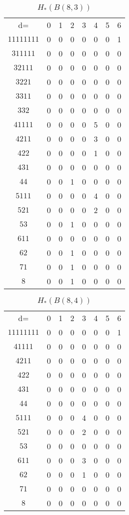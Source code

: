 \documentclass{elsart}
\begin{document}
\begin{table}
\begin{tabular}{cccccccc}
d=         & 0 & 1 & 2 & 3 & 4 & 5 & 6  \\
$11111111$ & 0 & 0 & 0 & 0 & 0 & 0 & 1  \\
$311111$   & 0 & 0 & 0 & 0 & 0 & 0 & 0  \\
$32111$    & 0 & 0 & 0 & 0 & 0 & 0 & 0  \\
$3221$     & 0 & 0 & 0 & 0 & 0 & 0 & 0  \\
$3311$     & 0 & 0 & 0 & 0 & 0 & 0 & 0  \\
$332$      & 0 & 0 & 0 & 0 & 0 & 0 & 0  \\
$41111$    & 0 & 0 & 0 & 0 & 5 & 0 & 0  \\
$4211$     & 0 & 0 & 0 & 0 & 3 & 0 & 0  \\
$422$      & 0 & 0 & 0 & 0 & 1 & 0 & 0  \\
$431$      & 0 & 0 & 0 & 0 & 0 & 0 & 0  \\
$44$       & 0 & 0 & 1 & 0 & 0 & 0 & 0  \\
$5111$     & 0 & 0 & 0 & 0 & 4 & 0 & 0  \\
$521$      & 0 & 0 & 0 & 0 & 2 & 0 & 0  \\
$53$       & 0 & 0 & 1 & 0 & 0 & 0 & 0  \\
$611$      & 0 & 0 & 0 & 0 & 0 & 0 & 0  \\
$62$       & 0 & 0 & 1 & 0 & 0 & 0 & 0  \\
$71$       & 0 & 0 & 1 & 0 & 0 & 0 & 0  \\
$8$        & 0 & 0 & 1 & 0 & 0 & 0 & 0  \\
\end{tabular}
\caption{$H_*(B(8,3))$}
\label{T:8_3}
\end{table}

\begin{table}
\begin{tabular}{cccccccc}
d= & 0 & 1 & 2 & 3 & 4 & 5 & 6  \\
$11111111$ & 0 & 0 & 0 & 0 & 0 & 0 & 1  \\
$41111$    & 0 & 0 & 0 & 0 & 0 & 0 & 0  \\
$4211$     & 0 & 0 & 0 & 0 & 0 & 0 & 0  \\
$422$      & 0 & 0 & 0 & 0 & 0 & 0 & 0  \\
$431$      & 0 & 0 & 0 & 0 & 0 & 0 & 0  \\
$44$       & 0 & 0 & 0 & 0 & 0 & 0 & 0  \\
$5111$     & 0 & 0 & 0 & 4 & 0 & 0 & 0  \\
$521$      & 0 & 0 & 0 & 2 & 0 & 0 & 0  \\
$53$       & 0 & 0 & 0 & 0 & 0 & 0 & 0  \\
$611$      & 0 & 0 & 0 & 3 & 0 & 0 & 0  \\
$62$       & 0 & 0 & 0 & 1 & 0 & 0 & 0  \\
$71$       & 0 & 0 & 0 & 0 & 0 & 0 & 0  \\
$8$        & 0 & 0 & 0 & 0 & 0 & 0 & 0  \\
\end{tabular}
\caption[$H_*(B(8,4))$]{$H_*(B(8, 4))$}
\label{T:8_4}
\end{table}
\end{document}
